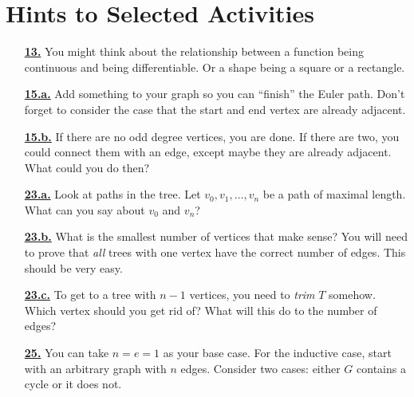 \documentclass[10pt,]{book}
\theoremstyle{plain}
\theoremstyle{definition}
\theoremstyle{definition}
\theoremstyle{definition}
\numberwithin{equation}{chapter}
\begin{document}
\chapter[{Hints to Selected Activities}]{Hints to Selected Activities}\label{appendix-3}
\begin{itemize}[itemsep=1em]
\hypertarget{a-13}{}\item[\textbf{\hyperref[activity-8]{13.}}]
\hypertarget{p-168}{}%
You might think about the relationship between a function being continuous and being differentiable.  Or a shape being a square or a rectangle.%

\hypertarget{a-15.a}{}\item[\textbf{\hyperref[task-13]{15.a.}}]
\hypertarget{p-181}{}%
Add something to your graph so you can ``finish'' the Euler path.  Don't forget to consider the case that the start and end vertex are already adjacent.%

\hypertarget{a-15.b}{}\item[\textbf{\hyperref[task-14]{15.b.}}]
\hypertarget{p-183}{}%
If there are no odd degree vertices, you are done.  If there are two, you could connect them with an edge, except maybe they are already adjacent.  What could you do then?%

\hypertarget{a-23.a}{}\item[\textbf{\hyperref[task-28]{23.a.}}]
\hypertarget{p-245}{}%
Look at paths in the tree.  Let \(v_0, v_1, \ldots, v_n\) be a path of maximal length.  What can you say about \(v_0\) and \(v_n\)?%

\hypertarget{a-23.b}{}\item[\textbf{\hyperref[task-29]{23.b.}}]
\hypertarget{p-247}{}%
What is the smallest number of vertices that make sense?  You will need to prove that \emph{all} trees with one vertex have the correct number of edges.  This should be very easy.%

\hypertarget{a-23.c}{}\item[\textbf{\hyperref[task-30]{23.c.}}]
\hypertarget{p-249}{}%
To get to a tree with \(n-1\) vertices, you need to \emph{trim} \(T\) somehow.  Which vertex should you get rid of?  What will this do to the number of edges?%

\hypertarget{a-25}{}\item[\textbf{\hyperref[activity-20]{25.}}]
\hypertarget{p-261}{}%
You can take \(n = e = 1\) as your base case.  For the inductive case, start with an arbitrary graph with \(n\) edges.  Consider two cases: either \(G\) contains a cycle or it does not.%


\end{itemize}
\end{document}
